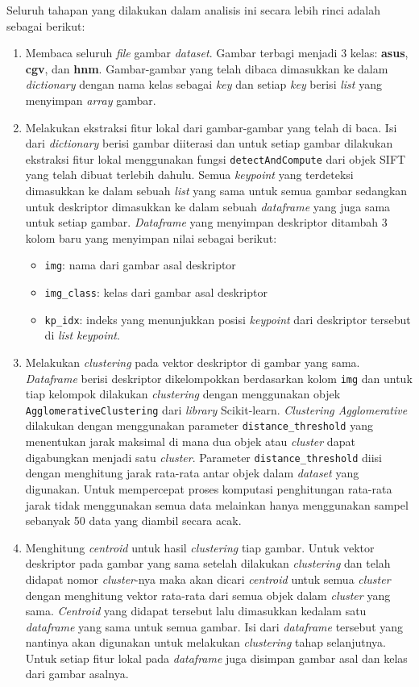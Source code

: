 Seluruh tahapan yang dilakukan dalam analisis ini secara lebih rinci adalah sebagai berikut:
\begin{enumerate}
	\item Membaca seluruh \textit{file} gambar \textit{dataset}. Gambar terbagi menjadi 3 kelas: \textbf{asus}, \textbf{cgv}, dan \textbf{hnm}. Gambar-gambar yang telah dibaca dimasukkan ke dalam \textit{dictionary} dengan nama kelas sebagai \textit{key} dan setiap \textit{key} berisi \textit{list} yang menyimpan \textit{array} gambar.
	\item Melakukan ekstraksi fitur lokal dari gambar-gambar yang telah di baca. Isi dari \textit{dictionary} berisi gambar diiterasi dan untuk setiap gambar dilakukan ekstraksi fitur lokal menggunakan fungsi \texttt{detectAndCompute} dari objek SIFT yang telah dibuat terlebih dahulu. Semua \textit{keypoint} yang terdeteksi dimasukkan ke dalam sebuah \textit{list} yang sama untuk semua gambar sedangkan untuk deskriptor dimasukkan ke dalam sebuah \textit{dataframe} yang juga sama untuk setiap gambar. \textit{Dataframe} yang menyimpan deskriptor ditambah 3 kolom baru yang menyimpan nilai sebagai berikut:
	\begin{itemize}
		\item \texttt{img}: nama dari gambar asal deskriptor
		\item \texttt{img\_class}: kelas dari gambar asal deskriptor
		\item \texttt{kp\_idx}: indeks yang menunjukkan posisi \textit{keypoint} dari deskriptor tersebut di \textit{list} \textit{keypoint}.
	\end{itemize}
	\item Melakukan \textit{clustering} pada vektor deskriptor di gambar yang sama. \textit{Dataframe} berisi deskriptor dikelompokkan berdasarkan kolom \texttt{img} dan untuk tiap kelompok dilakukan \textit{clustering} dengan menggunakan objek \texttt{AgglomerativeClustering} dari \textit{library} Scikit-learn. \textit{Clustering Agglomerative} dilakukan dengan menggunakan parameter \texttt{distance\_threshold} yang menentukan jarak maksimal di mana dua objek atau \textit{cluster} dapat digabungkan menjadi satu \textit{cluster}. Parameter \texttt{distance\_threshold} diisi dengan menghitung jarak rata-rata antar objek dalam \textit{dataset} yang digunakan. Untuk mempercepat proses komputasi penghitungan rata-rata jarak tidak menggunakan semua data melainkan hanya menggunakan sampel sebanyak 50 data yang diambil secara acak. 
	\item Menghitung \textit{centroid} untuk hasil \textit{clustering} tiap gambar. Untuk vektor deskriptor pada gambar yang sama setelah dilakukan \textit{clustering} dan telah didapat nomor \textit{cluster}-nya maka akan dicari \textit{centroid} untuk semua \textit{cluster} dengan menghitung vektor rata-rata dari semua objek dalam \textit{cluster} yang sama. \textit{Centroid} yang didapat tersebut lalu dimasukkan kedalam satu \textit{dataframe} yang sama untuk semua gambar. Isi dari \textit{dataframe} tersebut yang nantinya akan digunakan untuk melakukan \textit{clustering} tahap selanjutnya. Untuk setiap fitur lokal pada \textit{dataframe} juga disimpan gambar asal dan kelas dari gambar asalnya.

\end{enumerate}
